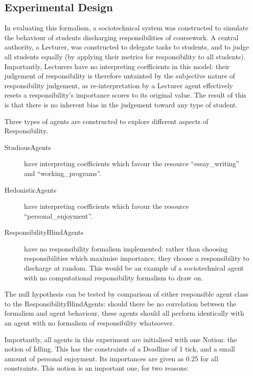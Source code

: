 \subsection{Experimental Design}
In evaluating this formalism, a sociotechnical system was constructed to simulate the behaviour of students discharging responsibilities of coursework. A central authority, a Lecturer, was constructed to delegate tasks to students, and to judge all students equally (by applying their metrics for responsibility to all students). Importantly, Lecturers have no interpreting coefficients in this model: their judgement of responsibility is therefore untainted by the subjective nature of responsibility judgement, as re-interpretation by a Lecturer agent effectively resets a responsibility's importance scores to its original value. The result of this is that there is no inherent bias in the judgement toward any type of student.\par

Three types of agents are constructed to explore different aspects of Responsibility. 

\begin{description}
    \item [StudiousAgents ] have interpreting coefficients which favour the resource ``essay\_writing'' and ``working\_programs''.
    \item [HedonisticAgents ] have interpreting coefficients which favour the resource ``personal\_enjoyment''.
    \item [ResponsibilityBlindAgents ] have no responsibility formalism implemented: rather than choosing responsibilities which maximise importance, they choose a responsibility to discharge at random. This would be an example of a sociotechnical agent with no computational responsibility formalism to draw on.
\end{description}

The null hypothesis can be tested by comparison of either responsible agent class to the ResponsibilityBlindAgents: should there be no correlation between the formalism and agent behaviour, these agents should all perform identically with an agent with no formalism of responsibility whatsoever.\par

Importantly, all agents in this experiment are initialised with one Notion: the notion of Idling. This has the constraints of a Deadline of 1 tick, and a small amount of personal enjoyment. Its importances are given as 0.25 for all constraints. This notion is an important one, for two reasons:

